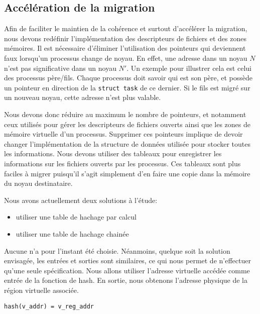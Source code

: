     \subsection{Accélération de la migration}

      Afin de faciliter le maintien de la cohérence et surtout d'accélérer la
      migration, nous devons redéfinir l'implémentation des descripteurs de
      fichiers et des zones mémoires. Il est nécessaire d'éliminer l'utilisation
      des pointeurs qui deviennent faux lorsqu'un processus change de noyau. En
      effet, une adresse dans un noyau $N$ n'est pas significative dans un noyau
      $N'$. Un exemple pour illustrer cela est celui des processus
      père/fils. Chaque processus doit savoir qui est son père, et possède un
      pointeur en direction de la \texttt{struct task} de ce dernier. Si le fils
      est migré sur un nouveau noyau, cette adresse n'est plus valable.

      Nous devons donc réduire au maximum le nombre de pointeurs, et notamment
      ceux utilisés pour gérer les descripteurs de fichiers ouverts ainsi que
      les zones de mémoire virtuelle d'un processus. Supprimer ces pointeurs
      implique de devoir changer l'implémentation de la structure de données
      utilisée pour stocker toutes les informations. Nous devons utiliser des
      tableaux pour enregistrer les informations sur les fichiers ouverts par
      les processus. Ces tableaux sont plus faciles à migrer puisqu'il s'agit
      simplement d'en faire une copie dans la mémoire du noyau destinataire.

      Nous avons actuellement deux solutions à l'étude:
      \begin{itemize}
        \item utiliser une table de hachage par calcul
        \item utiliser une table de hachage chainée
      \end{itemize}

      Aucune n'a pour l'instant été choisie. Néanmoins, quelque soit la solution
      envisagée, les entrées et sorties sont similaires, ce qui nous permet de
      n'effectuer qu'une seule spécification. Nous allons utiliser l'adresse
      virtuelle accédée comme entrée de la fonction de hash. En sortie, nous
      obtenons l'adresse physique de la région virtuelle associée.

      \begin{center}
        \texttt{hash(v\_addr) = v\_reg\_addr}
      \end{center}

